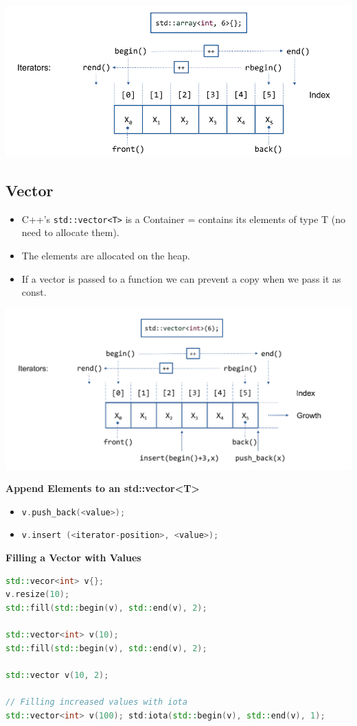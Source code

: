 \begin{center}
\includegraphics[width=0.75\linewidth]{images/array}
\end{center}

\subsection{Vector}
\begin{itemize}
  \itemsep -0.5em 
  \item C++'s \lstinline|std::vector<T>| is a Container = contains its elements of type T (no need to allocate them).
  \item The elements are allocated on the heap.
  \item If a vector is passed to a function we can prevent a copy when we pass it as const.
\end{itemize}

\begin{center}
\includegraphics[width=0.75\linewidth]{images/vector}
\end{center}
\textbf{Append Elements to an std::vector<T>}
\begin{itemize}
  \itemsep -0.5em 
  \item \lstinline[language=C++]|v.push_back(<value>);|
  \item \lstinline[language=C++]|v.insert (<iterator-position>, <value>);|
\end{itemize}

\textbf{Filling a Vector with Values}
\begin{lstlisting}[language=C++]
std::vecor<int> v{};
v.resize(10);
std::fill(std::begin(v), std::end(v), 2);

std::vector<int> v(10); 
std::fill(std::begin(v), std::end(v), 2);

std::vector v(10, 2);

// Filling increased values with iota
std::vector<int> v(100); std:iota(std::begin(v), std::end(v), 1);
\end{lstlisting}

